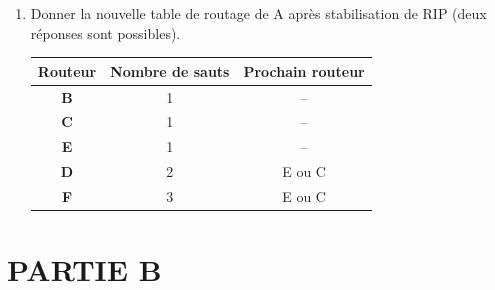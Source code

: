 \begin{enumerate}[series=monDS]
\begin{blocvisible}[height=1]
\end{blocvisible}



    \item Donner la nouvelle table de routage de A après stabilisation de RIP (deux réponses sont possibles).

    \begin{blocvisible}[height=3.5]
\begin{center}
\begin{tabular}{|c|c|c|}
\hline
\textbf{Routeur} & \textbf{Nombre de sauts} & \textbf{Prochain routeur} \\
\hline
\textbf{B} & 1 & -- \\
\hline
\textbf{C} & 1 & -- \\
\hline
\textbf{E} & 1 & -- \\
\hline
\textbf{D} & 2 & E ou C \\
\hline
\textbf{F} & 3 & E ou C\\
\hline
\end{tabular}
\end{center}
\end{blocvisible}
\end{enumerate}


\section*{PARTIE B}

